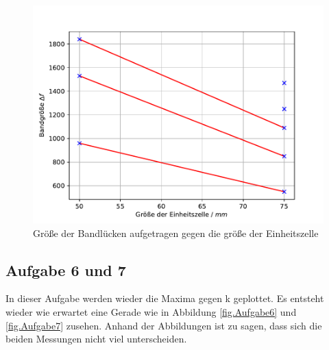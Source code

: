 \begin{figure}[h!]
  \centering
  \includegraphics[width=\textwidth]{newtest.pdf}
  \caption{Größe der Bandlücken aufgetragen gegen die größe der Einheitszelle}
  \label{fig.Aufgabe5a}
\end{figure}
\FloatBarrier

\subsection{Aufgabe 6 und 7}
In dieser Aufgabe werden wieder die Maxima gegen k geplottet. Es entsteht wieder wie erwartet eine Gerade wie in Abbildung \ref{fig.Aufgabe6} und \ref{fig.Aufgabe7} zusehen.
Anhand der Abbildungen ist zu sagen, dass sich die beiden Messungen nicht viel unterscheiden.

